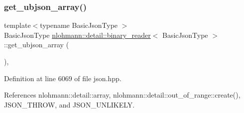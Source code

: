 \subsubsection{\texorpdfstring{get\+\_\+ubjson\+\_\+array()}{get\_ubjson\_array()}}
{\footnotesize\ttfamily template$<$typename Basic\+Json\+Type $>$ \\
Basic\+Json\+Type \hyperlink{classnlohmann_1_1detail_1_1binary__reader}{nlohmann\+::detail\+::binary\+\_\+reader}$<$ Basic\+Json\+Type $>$\+::get\+\_\+ubjson\+\_\+array (\begin{DoxyParamCaption}{ }\end{DoxyParamCaption})\hspace{0.3cm}{\ttfamily [inline]}, {\ttfamily [private]}}



Definition at line 6069 of file json.\+hpp.



References nlohmann\+::detail\+::array, nlohmann\+::detail\+::out\+\_\+of\+\_\+range\+::create(), J\+S\+O\+N\+\_\+\+T\+H\+R\+OW, and J\+S\+O\+N\+\_\+\+U\+N\+L\+I\+K\+E\+LY.


